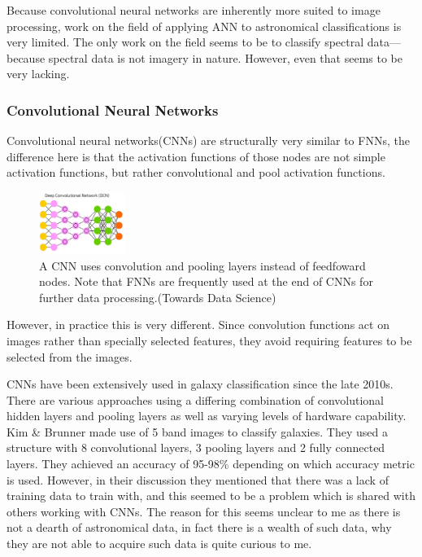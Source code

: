 \documentclass[a4paper,11pt]{article}
\begin{document}
Because convolutional neural networks are inherently more suited to image processing, work on the field of applying ANN to astronomical classifications is very limited. The only work on the field seems to be to classify spectral data—because spectral data is not imagery in nature.\cite{hampton_2017_using} However, even that seems to be very lacking.

\subsubsection{Convolutional Neural Networks}
Convolutional neural networks(CNNs) are structurally very similar to FNNs, the difference here is that the activation functions of those nodes are not simple activation functions, but rather convolutional and pool activation functions. 
\begin{figure}[ht]
\centering
\includegraphics[width=0.25\textwidth]{CNN.png}
\caption{\label{fig:CNN}A CNN uses convolution and pooling layers instead of feedfoward nodes. Note that FNNs are frequently used at the end of CNNs for further data processing.(Towards Data Science)}
\end{figure}

However, in practice this is very different. Since convolution functions act on images rather than specially selected features, they avoid requiring features to be selected from the images.

CNNs have been extensively used in galaxy classification since the late 2010s. There are various approaches using a differing combination of convolutional hidden layers and pooling layers as well as varying levels of hardware capability. Kim \& Brunner \cite{kim_2016_stargalaxy} made use of 5 band images to classify galaxies. They used a structure with 8 convolutional layers, 3 pooling layers and 2 fully connected layers. They achieved an accuracy of 95-98\% depending on which accuracy metric is used. However, in their discussion they mentioned that there was a lack of training data to train with, and this seemed to be a problem which is shared with others working with CNNs. \cite{khalifanoureldeenm_2017_deep} \cite{aniyan_2017_classifying} The reason for this seems unclear to me as there is not a dearth of astronomical data, in fact there is a wealth of such data, why they are not able to acquire such data is quite curious to me.
\end{document}
